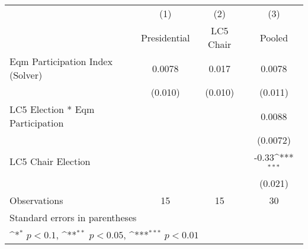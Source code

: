 {
\def\sym#1{\ifmmode^{#1}\else\(^{#1}\)\fi}
\begin{tabular}{l*{3}{c}}
\toprule
                &\multicolumn{1}{c}{(1)}&\multicolumn{1}{c}{(2)}&\multicolumn{1}{c}{(3)}\\
                &\multicolumn{1}{c}{Presidential}&\multicolumn{1}{c}{LC5 Chair}&\multicolumn{1}{c}{Pooled}\\
\midrule
Eqm Participation Index (Solver)&   0.0078         &    0.017         &   0.0078         \\
                &  (0.010)         &  (0.010)         &  (0.011)         \\
LC5 Election * Eqm Participation&                  &                  &   0.0088         \\
                &                  &                  & (0.0072)         \\
LC5 Chair Election&                  &                  &    -0.33\sym{***}\\
                &                  &                  &  (0.021)         \\
\midrule
Observations    &       15         &       15         &       30         \\
\bottomrule
\multicolumn{4}{l}{\footnotesize Standard errors in parentheses}\\
\multicolumn{4}{l}{\footnotesize \sym{*} \(p<0.1\), \sym{**} \(p<0.05\), \sym{***} \(p<0.01\)}\\
\end{tabular}
}
